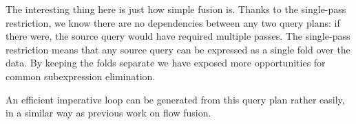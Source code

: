The interesting thing here is just how simple fusion is.
Thanks to the single-pass restriction, we know there are no dependencies between any two query plans: if there were, the source query would have required multiple passes.
The single-pass restriction means that any source query can be expressed as a single fold over the data.
By keeping the folds separate we have exposed more opportunities for common subexpression elimination.

An efficient imperative loop can be generated from this query plan rather easily, in a similar way as previous work on flow fusion\cite{lippmeier2013data}.

